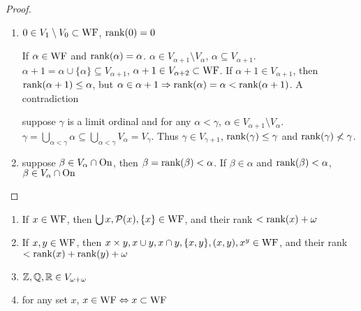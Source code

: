 \documentclass[11pt]{article}
\begin{document}
\begin{proof}
\begin{enumerate}
\item \(0\in V_1\setminus V_0\subset\operatorname{WF}\), \(\text{rank}(0)=0\)

If \(\alpha\in\operatorname{WF}\)
and
\(\text{rank}(\alpha)=\alpha\).
\(\alpha\in V_{\alpha+1}\setminus V_\alpha\), \(\alpha\subseteq V_{\alpha+1}\). \(\alpha+1=\alpha\cup\{\alpha\}\subseteq V_{\alpha+1}\), \(\alpha+1\in V_{\alpha+2}\subset\operatorname{WF}\).
If \(\alpha+1\in V_{\alpha+1}\), then \(\text{rank}(\alpha+1)\le\alpha\), but \(\alpha\in\alpha+1\Rightarrow\text{rank}(\alpha)=\alpha<\text{rank}(\alpha+1)\). A
contradiction

suppose \(\gamma\) is a limit ordinal and for any \(\alpha<\gamma\), \(\alpha\in V_{\alpha+1}\setminus V_\alpha\).
\(\gamma=\bigcup_{\alpha<\gamma}\alpha\subseteq\bigcup_{\alpha<\gamma}V_\alpha=V_\gamma\). Thus \(\gamma\in V_{\gamma+1}\), \(\text{rank}(\gamma)\le\gamma\) and \(\text{rank}(\gamma)\not<\gamma\).
\item suppose \(\beta\in V_\alpha\cap\operatorname{On}\), then \(\beta=\text{rank}(\beta)<\alpha\). If \(\beta\in\alpha\) and \(\text{rank}(\beta)<\alpha\), \(\beta\in V_\alpha\cap\operatorname{On}\)
\end{enumerate}
\end{proof}

\begin{lemma}[]
\begin{enumerate}
\item If \(x\in\operatorname{WF}\), then \(\bigcup x,\mathcal{P}(x),\{x\}\in\operatorname{WF}\), and their rank \(<\text{rank}(x)+\omega\)
\item If \(x,y\in\operatorname{WF}\), then \(x\times y,x\cup y,x\cap y,\{x,y\},(x,y),x^y\in\operatorname{WF}\), and their
rank \(<\text{rank}(x)+\text{rank}(y)+\omega\)
\item \(\mathbb{Z},\mathbb{Q},\mathbb{R}\in V_{\omega+\omega}\)
\item for any set \(x\), \(x\in\operatorname{WF}\Leftrightarrow x\subset\operatorname{WF}\)
\end{enumerate}
\end{lemma}
\end{document}
